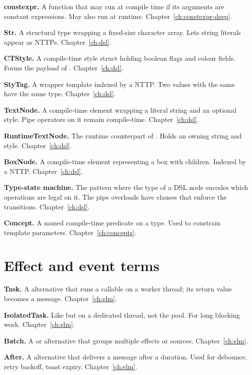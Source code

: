 \textbf{constexpr.} A function that may run at compile time if
its arguments are constant expressions. May also run at runtime.
Chapter~\ref{ch:constexpr-deep}.

\textbf{Str.} A structural type wrapping a fixed-size character
array. Lets string literals appear as NTTPs.
Chapter~\ref{ch:dsl}.

\textbf{CTStyle.} A compile-time style struct holding boolean
flags and colour fields. Forms the payload of .
Chapter~\ref{ch:dsl}.

\textbf{StyTag.} A wrapper template indexed by a 
NTTP. Two  values with the same 
have the same type. Chapter~\ref{ch:dsl}.

\textbf{TextNode.} A compile-time element wrapping a literal
string and an optional style. Pipe operators on it remain
compile-time. Chapter~\ref{ch:dsl}.

\textbf{RuntimeTextNode.} The runtime counterpart of
. Holds an owning string and style.
Chapter~\ref{ch:dsl}.

\textbf{BoxNode.} A compile-time element representing a box
with children. Indexed by a  NTTP.
Chapter~\ref{ch:dsl}.

\textbf{Type-state machine.} The pattern where the type of a
DSL node encodes which operations are legal on it. The pipe
overloads have  clauses that enforce the
transitions. Chapter~\ref{ch:dsl}.

\textbf{Concept.} A named compile-time predicate on a type. Used
to constrain template parameters. Chapter~\ref{ch:concepts}.

\section{Effect and event terms}

\textbf{Task.} A  alternative that runs a callable on
a worker thread; its return value becomes a message.
Chapter~\ref{ch:elm}.

\textbf{IsolatedTask.} Like  but on a dedicated
thread, not the pool. For long blocking work.
Chapter~\ref{ch:elm}.

\textbf{Batch.} A  or  alternative that
groups multiple effects or sources. Chapter~\ref{ch:elm}.

\textbf{After.} A  alternative that delivers a
message after a duration. Used for debounce, retry backoff,
toast expiry. Chapter~\ref{ch:elm}.

